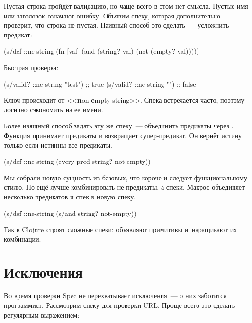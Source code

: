Пустая строка пройдёт валидацию, но чаще всего в этом нет смысла. Пустые имя или
заголовок означают ошибку. Объявим спеку, которая дополнительно проверит, что
строка не пустая. Наивный способ это сделать~--- усложнить предикат:


\begin{clojure}
(s/def ::ne-string
  (fn [val]
    (and (string? val)
         (not (empty? val)))))
\end{clojure}

\noindent
Быстрая проверка:

\begin{clojure}
(s/valid? ::ne-string "test") ;; true
(s/valid? ::ne-string "")     ;; false
\end{clojure}

\label{ne-string}

Ключ  происходит от <<\textbf{n}on-\textbf{e}mpty
string>>. Спека встречается часто, поэтому логично сэкономить на её имени.

Более изящный способ задать эту же спеку~--- объединить предикаты через
. Функция принимает предикаты и возвращает супер-предикат. Он
вернёт истину только если истинны все предикаты.

\begin{clojure}
(s/def ::ne-string
  (every-pred string? not-empty))
\end{clojure}


Мы собрали новую сущность из базовых, что короче и следует функциональному
стилю. Но ещё лучше комбинировать не предикаты, а спеки. Макрос 
объединяет несколько предикатов и спек в новую спеку:

\begin{clojure}
(s/def ::ne-string
  (s/and string? not-empty))
\end{clojure}

Так в Clojure строят сложные спеки: объявляют примитивы и~наращивают их
комбинации.

\section{Исключения}


Во время проверки Spec не перехватывает исключения~--- о них заботится
программист. Рассмотрим спеку для проверки URL. Проще всего это сделать
регулярным выражением:

